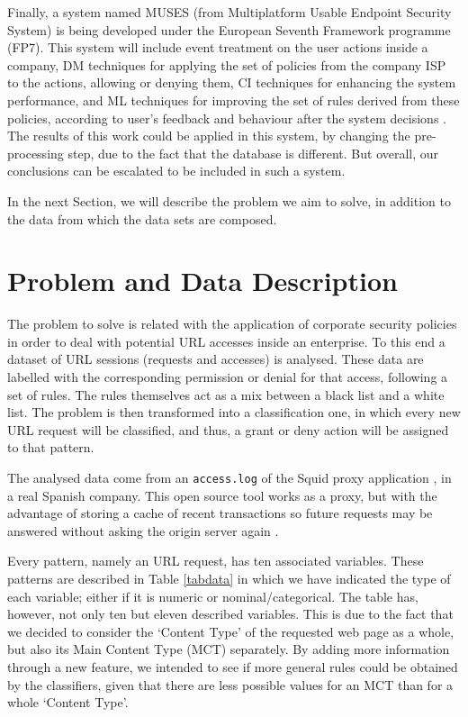 \documentclass{llncs}
\begin{document}
Finally, a system named MUSES (from Multiplatform Usable Endpoint
Security System) \cite{MUSES_SAC_14} is being developed under the
European Seventh Framework  programme (FP7). This system will include
event treatment on the user actions inside a company, DM techniques
for applying the set of policies from the company ISP to the actions,
allowing or denying them, CI techniques for enhancing the system
performance, and ML techniques for improving the set of rules derived
from these policies, according to user's feedback and behaviour after
the system decisions \cite{muses_sotics_13}. The results of this work
could be applied in this system, by changing the pre-processing step,
due to the fact that the database is different. But overall, our
conclusions can be escalated to be included in such a system.

In the next Section, we will describe the problem we aim to solve, in addition to the data from which the data sets are composed.

%

\section{Problem and Data Description}
\label{sec:problemDescription}

\noindent The problem to solve is related with the application of corporate security policies in order to deal with potential URL accesses inside an enterprise. To this end a dataset of URL sessions (requests and accesses) is analysed. These data are labelled with the corresponding permission or denial for that access, following a set of rules. The rules themselves act as a mix between a black list and a white list. The problem is then transformed into a classification one, in which every new URL request will be classified, and thus, a grant or deny action will be assigned to that pattern.

The analysed data come from an \texttt{access.log} of the Squid proxy application \cite{squid:site}, in a real Spanish company. This open source tool works as a proxy, but with the advantage of storing a cache of recent transactions so future requests may be answered without asking the origin server again \cite{DuaneWessels2004}.

Every pattern, namely an URL request, has ten associated variables. These patterns are described in Table \ref{tabdata} in which we have indicated the type of  each variable; either if it is numeric or nominal/categorical. The table has, however, not only ten but eleven described variables. This is due to the fact that we decided to consider the `Content Type' of the requested web page as a whole, but also its Main Content Type (MCT) separately. By adding more information through a new feature, we intended to see if more general rules could be obtained by the classifiers, given that there are less possible values for an MCT than for a whole `Content Type'.
\end{document}

